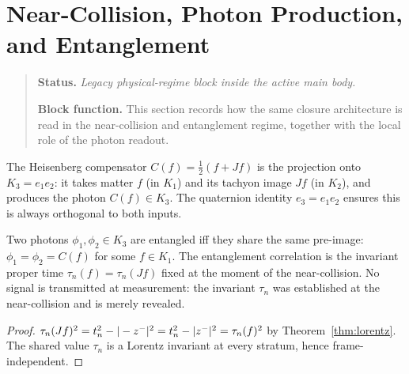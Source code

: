 \section{Near-Collision, Photon Production, and Entanglement}
\begin{quote}\small
\noindent\textbf{Status.} \emph{Legacy physical-regime block inside the active main body.}\par
\noindent\textbf{Block function.} This section records how the same closure architecture is read in the near-collision and entanglement regime, together with the local role of the photon readout.
\end{quote}
\label{sec:entanglement}

\begin{proposition}\label{prop:compensator}
The Heisenberg compensator $C(f)=\tfrac{1}{2}(f+Jf)$ is the projection
onto $K_3=e_1 e_2$: it takes matter $f$ (in $K_1$) and its tachyon image
$Jf$ (in $K_2$), and produces the photon $C(f)\in K_3$.
The quaternion identity $e_3=e_1 e_2$ ensures this is always orthogonal
to both inputs.
\end{proposition}

\begin{theorem}
\label{thm:entanglement-shared-time}
Two photons $\phi_1,\phi_2\in K_3$ are entangled iff they share the same
pre-image: $\phi_1=\phi_2=C(f)$ for some $f\in K_1$.
The entanglement correlation is the invariant proper time
$\tau_n(f)=\tau_n(Jf)$ fixed at the moment of the near-collision.
No signal is transmitted at measurement: the invariant $\tau_n$ was
established at the near-collision and is merely revealed.
\end{theorem}

\begin{proof}
$\tau_n(Jf)^2 = t_n^2 - |-z^-|^2 = t_n^2 - |z^-|^2 = \tau_n(f)^2$
by Theorem~\ref{thm:lorentz}.
The shared value $\tau_n$ is a Lorentz invariant at every stratum,
hence frame-independent.
\end{proof}


